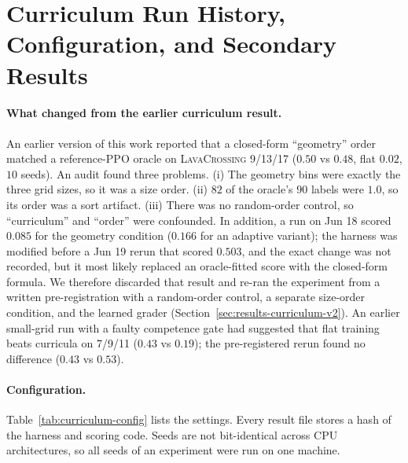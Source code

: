 \documentclass[twoside]{article}
\begin{document}
\section{Curriculum Run History, Configuration, and Secondary Results}
\label{app:history}

\paragraph{What changed from the earlier curriculum result.} An earlier version of this work reported that a closed-form ``geometry'' order matched a reference-PPO oracle on \textsc{LavaCrossing} 9/13/17 ($0.50$ vs $0.48$, flat $0.02$, $10$ seeds). An audit found three problems. (i) The geometry bins were exactly the three grid sizes, so it was a size order. (ii) $82$ of the oracle's $90$ labels were $1.0$, so its order was a sort artifact. (iii) There was no random-order control, so ``curriculum'' and ``order'' were confounded. In addition, a run on Jun 18 scored $0.085$ for the geometry condition ($0.166$ for an adaptive variant); the harness was modified before a Jun 19 rerun that scored $0.503$, and the exact change was not recorded, but it most likely replaced an oracle-fitted score with the closed-form formula. We therefore discarded that result and re-ran the experiment from a written pre-registration with a random-order control, a separate size-order condition, and the learned grader (Section~\ref{sec:results-curriculum-v2}). An earlier small-grid run with a faulty competence gate had suggested that flat training beats curricula on 7/9/11 ($0.43$ vs $0.19$); the pre-registered rerun found no difference ($0.43$ vs $0.53$).

\paragraph{Configuration.} Table~\ref{tab:curriculum-config} lists the settings. Every result file stores a hash of the harness and scoring code. Seeds are not bit-identical across CPU architectures, so all seeds of an experiment were run on one machine.
\end{document}
